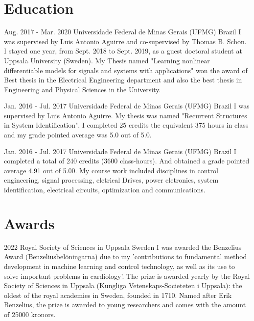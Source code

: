 \documentclass[10pt,letterpaper]{article} %
\begin{document}
\section*{Education} %


    { Aug. 2017 - Mar. 2020 }
    { Universidade Federal de Minas Gerais (UFMG) }
    { Brazil }
    { I was supervised by Luis Antonio Aguirre and co-supervised by Thomas B. Schon.  I stayed one year, from Sept. 2018 to Sept. 2019, as a guest doctoral student at Uppsala University (Sweden). My Thesis named "Learning nonlinear differentiable models for signals and systems with applications" won the award of Best thesis in the Electrical Engineering department and also the best thesis in Engineering and Physical Sciences in the University. }

    { Jan. 2016 - Jul. 2017 }
    { Universidade Federal de Minas Gerais (UFMG) }
    { Brazil }
    { I was supervised by Luis Antonio Aguirre. My thesis was named "Recurrent Structures in System Identification". I completed 25 credits the equivalent 375 hours in class and my grade pointed average was 5.0 out of 5.0. }

    { Jan. 2016 - Jul. 2017 }
    { Universidade Federal de Minas Gerais (UFMG) }
    { Brazil }
    { I completed a total of 240  credits (3600 class-hours). And obtained a grade pointed average 4.91 out of 5.00. My course work included disciplines in control engineering, signal processing, eletrical Drives, power eletronics, system identification, electrical circuits, optimization and communications. }



\section*{Awards}


    { 2022 }
    { Royal Society of Sciences in Uppsala }
    { Sweden }
    { I was awarded the Benzelius Award (Benzeliusbelöningarna) due to my 'contributions to fundamental method development in machine learning and control technology, as well as its use to solve important problems in cardiology'. The prize is awarded yearly by the Royal Society of Sciences in Uppsala (Kungliga Vetenskaps-Societeten i Uppsala): the oldest of the royal academies in Sweden, founded in 1710. Named after Erik Benzelius, the prize is awarded to young researchers and comes with the amount of 25000 kronors. }
\end{document}
